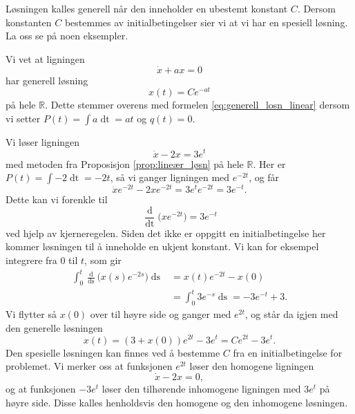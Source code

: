 \documentclass{article}
\theoremstyle{plain}
\theoremstyle{definition}
\theoremstyle{remark}
\newenvironment{ex}
{\pushQED{\qed}\renewcommand{\qedsymbol}{$\triangle$}\exx}
{\popQED\endexx}
\newcommand{\diff}[1]{\mathop{d#1}}
\newcommand{\fcn}{x}
\newcommand{\expfcn}[1]{e^{#1}}
\newcommand{\bigparanth}[1]{\big(#1\big)}
\begin{document}
Løsningen kalles generell når den inneholder en ubestemt konstant $C$. Dersom konstanten $C$ bestemmes av initialbetingelser sier vi at vi har en spesiell løsning. La oss se på noen eksempler.

\begin{ex}
    Vi vet at ligningen
    \begin{equation*}
        \dot{\fcn} + a \fcn = 0
    \end{equation*}
    har generell løsning
    \begin{equation*}
        \fcn(t) = C \expfcn{-a t}
    \end{equation*}
    på hele $\mathbb{R}$. Dette stemmer overens med formelen \eqref{eq:generell_losn_linear} dersom vi setter $P(t) = \int a \diff{t} = at$ og $q(t) = 0$.
\end{ex}

\begin{ex} \label{eks:grundig_lineær}
    Vi løser ligningen
    \begin{equation*}
        \dot{\fcn} - 2\fcn = 3\expfcn{t}
    \end{equation*}
    med metoden fra Proposisjon \ref{prop:lineær_løsn} på hele $\mathbb{R}$. Her er $P(t) = \int -2 \diff{t} = -2t$, så vi ganger ligningen med $\expfcn{-2t}$, og får
    \begin{equation*}
        \dot{\fcn} \expfcn{-2t} - 2\fcn \expfcn{-2t} = 3\expfcn{t} \expfcn{-2t} = 3 \expfcn{-t}.
    \end{equation*}
    Dette kan vi forenkle til
    \begin{equation*}
        \frac{\diff{}}{\diff{t}} \bigparanth{\fcn \expfcn{-2t}} = 3 \expfcn{-t}
    \end{equation*}
    ved hjelp av kjerneregelen. Siden det ikke er oppgitt en initialbetingelse her kommer løsningen til å inneholde en ukjent konstant. Vi kan for eksempel integrere fra $0$ til $t$, som gir
    \begin{equation*}
        \begin{aligned}
            \int_0^t \frac{\diff{}}{\diff{s}} \bigparanth{\fcn(s) \expfcn{-2s}} \diff{s} & = \fcn(t)\expfcn{-2t} - \fcn(0) \\
            & = \int_0^t 3\expfcn{-s} \diff{s} = -3\expfcn{-t} + 3.
        \end{aligned}
    \end{equation*}
    Vi flytter så $x(0)$ over til høyre side og ganger med $\expfcn{2t}$, og står da igjen med den generelle løsningen
    \begin{equation*}
        \fcn(t) = (3+\fcn(0)) \expfcn{2t} - 3\expfcn{t} = C \expfcn{2t} - 3\expfcn{t}.
    \end{equation*}
    Den spesielle løsningen kan finnes ved å bestemme $C$ fra en initialbetingelse for problemet. Vi merker oss at funksjonen $\expfcn{2t}$ løser den homogene ligningen
    \begin{equation*}
        \dot{\fcn} - 2\fcn = 0,
    \end{equation*}
    og at funksjonen $-3\expfcn{t}$ løser den tilhørende inhomogene ligningen med $3\expfcn{t}$ på høyre side. Disse kalles henholdsvis den homogene og den inhomogene løsningen.
\end{ex}
\end{document}
